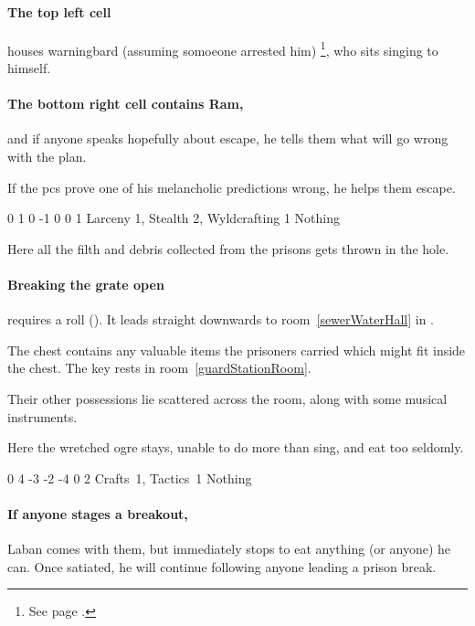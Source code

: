 \begin{multicols}{2}


\paragraph{The top left cell}
houses \gls{warningbard} (assuming somoeone arrested him)%
\footnote{See page \pageref{warningbard}.},
who sits singing to himself.

\paragraph{The bottom right cell contains Ram,}
and if anyone speaks hopefully about escape, he tells them what will go wrong with the plan.

If the \glspl{pc} prove one of his melancholic predictions wrong, he helps them escape.

{0}%
{1}%
{{0}%
{-1}%
{0}}%
{0}%
{1}%
{Larceny 1, Stealth 2, Wyldcrafting 1}%
{Nothing}%
{}


Here all the filth and debris collected from the prisons gets thrown in the hole.

\paragraph{Breaking the grate open}
requires a  roll (\tn[10]).
It leads straight downwards to room~\vref{sewerWaterHall} in .


The chest contains any valuable items the prisoners carried which might fit inside the chest.
The key rests in room~\ref{guardStationRoom}.

Their other possessions lie scattered across the room, along with some musical instruments.


Here the wretched ogre stays, unable to do more than sing, and eat too seldomly.

  {0}%
  {4}%
  {{-3}%
  {-2}%
  {-4}}%
  {0}%
  {2}%
  {Crafts~1, Tactics~1}%
  {Nothing}%
  {}

\paragraph{If anyone stages a breakout,}
Laban comes with them, but immediately stops to eat anything (or anyone) he can.
Once satiated, he will continue following anyone leading a prison break.

\end{multicols}
